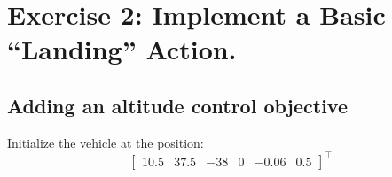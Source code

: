 \documentclass{article}
\begin{document}
%
%
%
\clearpage

\section{Exercise 2: Implement a Basic “Landing” Action.}
\subsection{Adding an altitude control objective}
Initialize the vehicle at the position:
\begin{displaymath}
\begin{bmatrix} 10.5 & 37.5 & -38 & 0 & -0.06 & 0.5 \end{bmatrix}^\top
\end{displaymath} 
\end{document}

